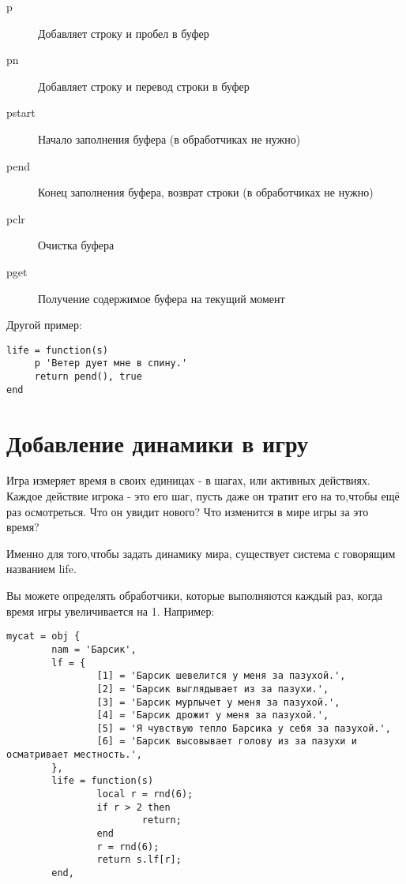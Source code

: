 \documentclass[a4paper,12pt]{article}
\begin{document}
\begin{description}
\item[p] Добавляет строку и пробел в буфер
\item[pn] Добавляет строку и перевод строки в буфер
\item[pstart] Начало заполнения буфера (в обработчиках не нужно)
\item[pend] Конец заполнения буфера, возврат строки (в обработчиках не нужно)
\item[pclr] Очистка буфера
\item[pget] Получение содержимое буфера на текущий момент
\end{description}

Другой пример:

\begin{verbatim}
life = function(s)
     p 'Ветер дует мне в спину.'
     return pend(), true
end
\end{verbatim}

\section{Добавление динамики в игру}

Игра измеряет время в своих единицах - в шагах, или активных действиях. Каждое действие игрока - это его шаг, пусть даже он тратит его на то,чтобы ещё раз осмотреться. Что он увидит нового? Что изменится в мире игры за это время?

Именно для того,чтобы задать динамику мира, существует система с говорящим названием life.

Вы можете определять обработчики, которые выполняются каждый раз, когда время игры увеличивается на 1. Например:

\begin{verbatim}
mycat = obj {
        nam = 'Барсик',
        lf = {
                [1] = 'Барсик шевелится у меня за пазухой.',
                [2] = 'Барсик выглядывает из за пазухи.',
                [3] = 'Барсик мурлычет у меня за пазухой.',
                [4] = 'Барсик дрожит у меня за пазухой.',
                [5] = 'Я чувствую тепло Барсика у себя за пазухой.',
                [6] = 'Барсик высовывает голову из за пазухи и осматривает местность.',
        },
        life = function(s)
                local r = rnd(6);
                if r > 2 then
                        return;
                end
                r = rnd(6);
                return s.lf[r];
        end,
\end{verbatim}
\end{document}
